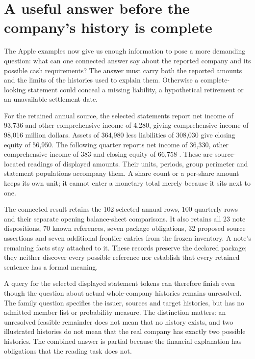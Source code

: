 \section{A useful answer before the company's history is complete}
\label{sec:real-package-connection}

The Apple examples now give us enough information to pose a more demanding
question: what can one connected answer say about the reported company and
its possible cash requirements? The answer must carry both the reported
amounts and the limits of the histories used to explain them. Otherwise a
complete-looking statement could conceal a missing liability, a hypothetical
retirement or an unavailable settlement date.

For the retained annual source, the selected statements report net income of
93,736 and other comprehensive income of 4,280, giving comprehensive income
of 98,016 million dollars. Assets of 364,980 less liabilities of 308,030 give
closing equity of 56,950. The following quarter reports net income of 36,330,
other comprehensive income of 383 and closing equity of 66,758
\citep[consolidated financial statements]{apple2024,apple2025q1}. These are
source-located readings of displayed amounts. Their units, periods, group
perimeter and statement populations accompany them. A share count or a
per-share amount keeps its own unit; it cannot enter a monetary total merely
because it sits next to one.

The connected result retains the 102 selected annual rows, 100 quarterly rows
and their separate opening balance-sheet comparisons. It also retains all
23 note dispositions, 70 known references, seven package obligations,
32 proposed source assertions and seven additional frontier entries from
the frozen inventory. A note's remaining facts stay attached to it. These
records preserve the declared package; they neither discover every possible
reference nor establish that every retained sentence has a formal meaning.

A query for the selected displayed statement tokens can therefore finish even
though the question about actual whole-company histories remains unresolved.
The family question specifies the issuer, sources and target histories, but
has no admitted member list or probability measure. The distinction matters:
an unresolved feasible remainder does not mean that no history exists, and
two illustrated histories do not mean that the real company has exactly two
possible histories. The combined answer is partial because the financial
explanation has obligations that the reading task does not.

